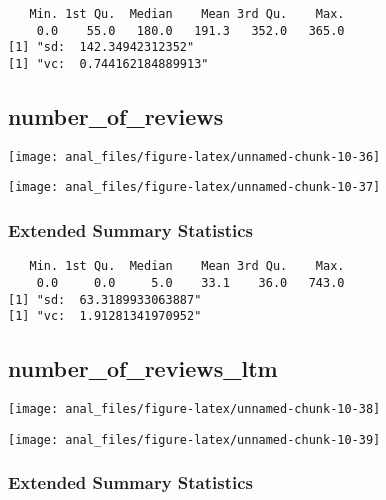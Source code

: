 \begin{verbatim}   Min. 1st Qu.  Median    Mean 3rd Qu.    Max. 
    0.0    55.0   180.0   191.3   352.0   365.0 
[1] "sd:  142.34942312352"
[1] "vc:  0.744162184889913"
\end{verbatim}

\pagebreak

\hypertarget{number_of_reviews}{%
\subsection{number\_of\_reviews}\label{number_of_reviews}}

\begin{center}\texttt{[image: anal\_files/figure-latex/unnamed-chunk-10-36]} \end{center}

\begin{center}\texttt{[image: anal\_files/figure-latex/unnamed-chunk-10-37]} \end{center}

\hypertarget{extended-summary-statistics-11}{%
\subsubsection{Extended Summary
Statistics}\label{extended-summary-statistics-11}}

\begin{verbatim}   Min. 1st Qu.  Median    Mean 3rd Qu.    Max. 
    0.0     0.0     5.0    33.1    36.0   743.0 
[1] "sd:  63.3189933063887"
[1] "vc:  1.91281341970952"
\end{verbatim}

\pagebreak

\hypertarget{number_of_reviews_ltm}{%
\subsection{number\_of\_reviews\_ltm}\label{number_of_reviews_ltm}}

\begin{center}\texttt{[image: anal\_files/figure-latex/unnamed-chunk-10-38]} \end{center}

\begin{center}\texttt{[image: anal\_files/figure-latex/unnamed-chunk-10-39]} \end{center}

\hypertarget{extended-summary-statistics-12}{%
\subsubsection{Extended Summary
Statistics}\label{extended-summary-statistics-12}}

